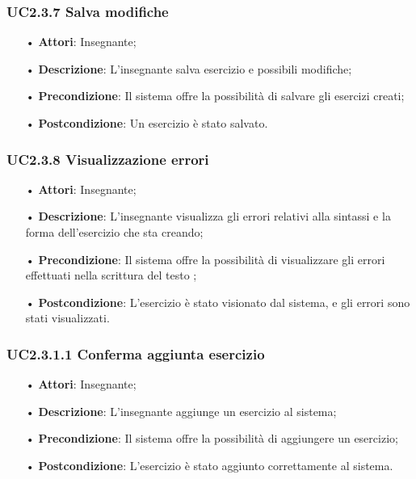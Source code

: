\subsubsection{UC2.3.7	Salva modifiche}
\begin{itemize}
	\item[•] \textbf{Attori}: Insegnante;
	\item[•] \textbf{Descrizione}: L'insegnante salva esercizio e possibili modifiche;
	\item[•] \textbf{Precondizione}: Il sistema offre la possibilità di salvare gli esercizi creati;
	\item[•] \textbf{Postcondizione}: Un esercizio è stato salvato.
\end{itemize}

\subsubsection{UC2.3.8 Visualizzazione errori}
\begin{itemize}
	\item[•] \textbf{Attori}: Insegnante;
	\item[•] \textbf{Descrizione}: L'insegnante visualizza gli errori relativi alla sintassi e la forma dell’esercizio che sta creando;
	\item[•] \textbf{Precondizione}: Il sistema offre la possibilità di visualizzare gli errori effettuati nella scrittura del testo ;
	\item[•] \textbf{Postcondizione}: L’esercizio è stato visionato dal sistema, e gli errori sono stati visualizzati.
\end{itemize}

\subsubsection{UC2.3.1.1 Conferma aggiunta esercizio}
\begin{itemize}
	\item[•] \textbf{Attori}: Insegnante;
	\item[•] \textbf{Descrizione}: L'insegnante aggiunge un esercizio al sistema;
	\item[•] \textbf{Precondizione}: Il sistema offre la possibilità di aggiungere un esercizio;
	\item[•] \textbf{Postcondizione}: L’esercizio è stato aggiunto correttamente al sistema.
\end{itemize}

